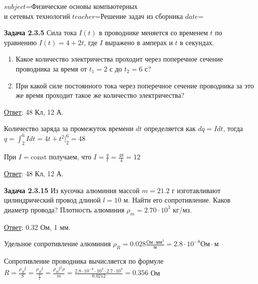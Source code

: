 $subject$=Физические основы компьютерных \\ и сетевых технологий
$teacher$=Решение задач из сборника
$date$=

\begin{tcolorbox}
    \textbf{Задача 2.3.5} Сила тока $I(t)$ в проводнике меняется со временем $t$ по
    уравнению $I(t) = 4 + 2t$, где $I$ выражено в амперах и $t$
    в секундах.

    \begin{enumerate}
        \item Какое количество электричества проходит через поперечное сечение
        проводника за время от $t_1 = 2$ с до $t_2 = 6$ с? 
        \item При какой силе постоянного тока через поперечное сечение 
        проводника за это же время проходит
        такое же количество электричества?
    \end{enumerate}

    \begin{UpsideDown}
        \footnotesize
        \underline{Ответ}: 48 Кл, 12 А.
    \end{UpsideDown}
\end{tcolorbox}

Количество заряда за промежуток времени $dt$ определяется как $dq = I dt$, тогда $q = \int_2^6 Idt = 4t + t^2 \Big|_2^6 = 48$

При $I = \mathrm{const}$ получаем, что $I = \frac{q}{t} = \frac{48}{4} = 12$

\bigvspace

\underline{Ответ}: 48 Кл, 12 А.

\begin{tcolorbox}
    \textbf{Задача 2.3.15} Из кусочка алюминия массой $m = 21.2$ г изготавливают
    цилиндрический провод длиной $l = 10$ м. Найти его сопротивление. Каков диаметр провода? 
    Плотность алюминия $\rho_m = 2.70 \cdot 10^3$ кг/мз.

    \begin{UpsideDown}
        \footnotesize
        \underline{Ответ}: 0.32 Ом, 1 мм.
    \end{UpsideDown}
\end{tcolorbox}

Удельное сопротивление алюминия $\rho_R = 0.028 \frac{\text{Ом} \cdot \text{мм}^2}{\text{м}} = 2.8 \cdot 10^{-8} \text{Ом} \cdot \text{м}$

Сопротивление проводника вычисляется по формуле $R = \frac{\rho_R l}{S} = \frac{\rho_R l}{\frac{V}{l}} = \frac{\rho_R l^2 \rho}{m} = 
\frac{2.8 \cdot 10^{-8} \cdot 10^2 \cdot 2.7 \cdot 10^3}{0.0212} = 0.356$ Ом

